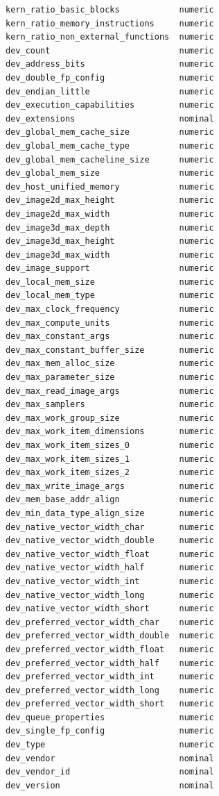 \begin{multicols}{2}
\begin{Verbatim}[fontsize=\footnotesize]
kern_ratio_basic_blocks            numeric
kern_ratio_memory_instructions     numeric
kern_ratio_non_external_functions  numeric
dev_count                          numeric
dev_address_bits                   numeric
dev_double_fp_config               numeric
dev_endian_little                  numeric
dev_execution_capabilities         numeric
dev_extensions                     nominal
dev_global_mem_cache_size          numeric
dev_global_mem_cache_type          numeric
dev_global_mem_cacheline_size      numeric
dev_global_mem_size                numeric
dev_host_unified_memory            numeric
dev_image2d_max_height             numeric
dev_image2d_max_width              numeric
dev_image3d_max_depth              numeric
dev_image3d_max_height             numeric
dev_image3d_max_width              numeric
dev_image_support                  numeric
dev_local_mem_size                 numeric
dev_local_mem_type                 numeric
dev_max_clock_frequency            numeric
dev_max_compute_units              numeric
dev_max_constant_args              numeric
dev_max_constant_buffer_size       numeric
dev_max_mem_alloc_size             numeric
dev_max_parameter_size             numeric
dev_max_read_image_args            numeric
dev_max_samplers                   numeric
dev_max_work_group_size            numeric
dev_max_work_item_dimensions       numeric
dev_max_work_item_sizes_0          numeric
dev_max_work_item_sizes_1          numeric
dev_max_work_item_sizes_2          numeric
dev_max_write_image_args           numeric
dev_mem_base_addr_align            numeric
dev_min_data_type_align_size       numeric
dev_native_vector_width_char       numeric
dev_native_vector_width_double     numeric
dev_native_vector_width_float      numeric
dev_native_vector_width_half       numeric
dev_native_vector_width_int        numeric
dev_native_vector_width_long       numeric
dev_native_vector_width_short      numeric
dev_preferred_vector_width_char    numeric
dev_preferred_vector_width_double  numeric
dev_preferred_vector_width_float   numeric
dev_preferred_vector_width_half    numeric
dev_preferred_vector_width_int     numeric
dev_preferred_vector_width_long    numeric
dev_preferred_vector_width_short   numeric
dev_queue_properties               numeric
dev_single_fp_config               numeric
dev_type                           numeric
dev_vendor                         nominal
dev_vendor_id                      nominal
dev_version                        nominal
\end{Verbatim}
\end{multicols}

